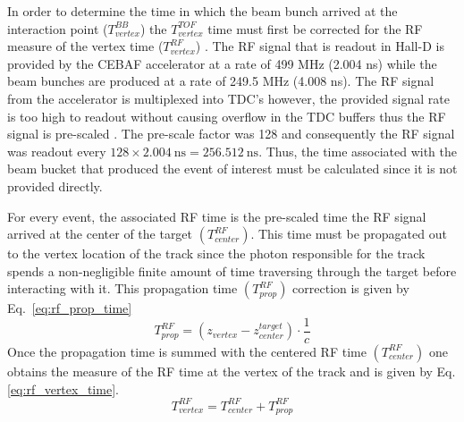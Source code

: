 {In order to determine the time in which the beam bunch arrived at the interaction point ($T^{BB}_{vertex}$) the $T^{TOF}_{vertex}$ time must first be corrected for the RF measure of the vertex time ($T^{RF}_{vertex}$) .  The RF signal that is readout in Hall-D is provided by the CEBAF accelerator at a rate of 499 MHz (2.004 ns) while the beam bunches are produced at a rate of  249.5 MHz (4.008 ns).  The RF signal from the accelerator is multiplexed into TDC's however, the provided signal rate is too high to readout without causing overflow in the TDC buffers thus the RF signal is pre-scaled \cite{mattione_rf_wiki}.  The pre-scale factor was 128 and consequently the RF signal was readout every $\mathrm{128 \times 2.004\ ns = 256.512\ ns}$.  Thus, the time associated with the beam bucket that produced the event of interest must be calculated since it is not provided directly.

For every event, the associated RF time is the pre-scaled time the RF signal arrived at the center of the target $(T^{RF}_{center})$. This time must be propagated out to the vertex location of the track since the photon responsible for the track spends a non-negligible finite amount of time traversing through the target before interacting with it. This propagation time $(T^{RF}_{prop})$ correction is given by Eq.~\ref{eq:rf_prop_time}
	\begin{equation} \label{eq:rf_prop_time}
		T^{RF}_{prop} = (z_{vertex} - z^{target}_{center}) \cdot \frac{1}{c} 
	\end{equation} 
Once the propagation time is summed with the centered RF time $(T^{RF}_{center})$ one obtains the measure of the RF time at the vertex of the track and is given by Eq. \ref{eq:rf_vertex_time}.
	\begin{equation} \label{eq:rf_vertex_time}
		T^{RF}_{vertex} = T^{RF}_{center} + T^{RF}_{prop}
	\end{equation}

}
